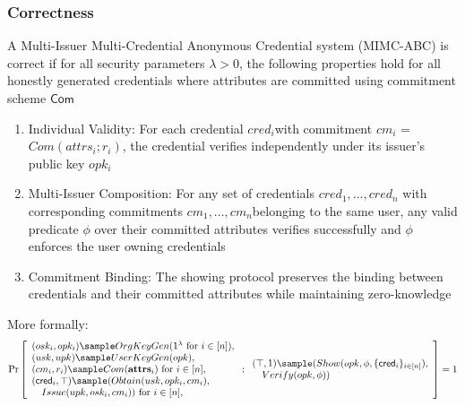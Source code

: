 \subsubsection{Correctness}
\begin{definition}
A Multi-Issuer Multi-Credential Anonymous Credential system (MIMC-ABC) is correct if for all security parameters $\lambda > 0$, the following properties hold for all honestly generated credentials where attributes are committed using commitment scheme $\mathsf{Com}$

\begin{enumerate}
    \item Individual Validity: For each credential $cred_i $with commitment $cm_i$ = $Com(attrs_i; r_i)$, the credential verifies independently under its issuer's public key $opk_i$

    \item Multi-Issuer Composition: For any set of credentials ${cred_1,...,cred_n}$ with corresponding commitments ${cm_1,...,cm_n} $belonging to the same user, any valid predicate $\phi$ over their committed attributes verifies successfully and $\phi$ enforces the user owning credentials

    \item Commitment Binding: The showing protocol preserves the binding between credentials and their committed attributes while maintaining zero-knowledge
\end{enumerate}

\noindent More formally:
\[
        \Pr
            \left [
            \begin{array}{l}
                (osk_i, opk_i) \sample OrgKeyGen(\secparam \text{ for } i \in [n]),\\
                (usk, upk) \sample UserKeyGen(opk),\\
                (cm_i, r_i) \sample Com(\mathbf{attrs}_i) \text{ for } i \in [n],\\
                (\mathsf{cred}_i, \top) \sample (Obtain(usk, opk_i, cm_i),\\
                \quad Issue(upk, osk_i, cm_i)) \text{ for } i \in [n],\\
            \end{array}
                : 
                \begin{array}{l}
                    (\top, 1) \sample (Show(opk, \phi, \{\mathsf{cred}_i\}_{i \in [n]}),\\
                    \quad Verify(opk, \phi))
                \end{array}
                \right ]
             = 1
\]
\end{definition}


